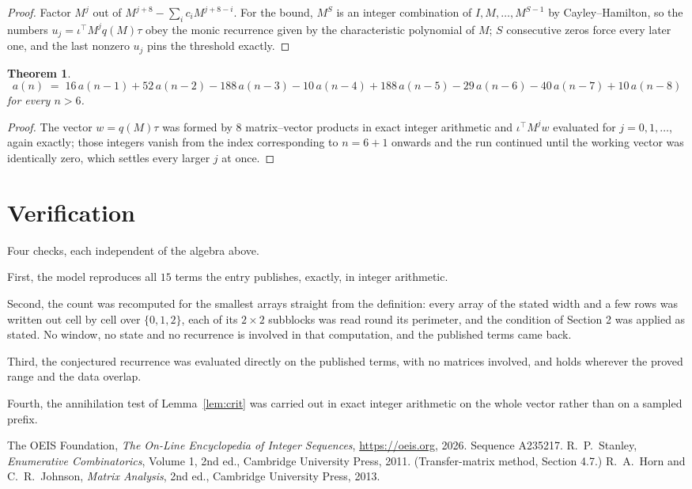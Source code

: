 \documentclass[11pt,a4paper]{article}
\theoremstyle{plain}
\newtheorem{theorem}{Theorem}
\theoremstyle{definition}
\begin{document}
\begin{proof}
Factor $M^{j}$ out of $M^{j+8}-\sum_ic_iM^{j+8-i}$. For the bound, $M^{S}$
is an integer combination of $I,M,\dots,M^{S-1}$ by Cayley--Hamilton, so the numbers
$u_j=\iota^{\!\top}M^{j}q(M)\tau$ obey the monic recurrence given by the characteristic
polynomial of $M$; $S$ consecutive zeros force every later one, and the last nonzero $u_j$
pins the threshold exactly.
\end{proof}

\begin{theorem}
\[
a(n)\;=\;16\,a(n-1) + 52\,a(n-2) - 188\,a(n-3) - 10\,a(n-4) + 188\,a(n-5) - 29\,a(n-6) - 40\,a(n-7) + 10\,a(n-8)
\]
for every $n>6$.
\end{theorem}

\begin{proof}
The vector $w=q(M)\tau$ was formed by $8$ matrix--vector products in exact integer
arithmetic and $\iota^{\!\top}M^{j}w$ evaluated for $j=0,1,\dots$, again exactly; those
integers vanish from the index corresponding to $n=6+1$ onwards and the run continued
until the working vector was identically zero, which settles every larger $j$ at once.
\end{proof}

\section{Verification}

Four checks, each independent of the algebra above.

First, the model reproduces all $15$ terms the entry publishes, exactly, in integer
arithmetic.

Second, the count was recomputed for the smallest arrays straight from the definition: every
array of the stated width and a few rows was written out cell by cell over $\{0,1,2\}$, each of
its $2\times2$ subblocks was read round its perimeter, and the condition of Section 2 was
applied as stated. No window, no state and no recurrence is involved in that computation, and
the published terms came back.

Third, the conjectured recurrence was evaluated directly on the published terms, with no
matrices involved, and holds wherever the proved range and the data overlap.

Fourth, the annihilation test of Lemma~\ref{lem:crit} was carried out in exact integer
arithmetic on the whole vector rather than on a sampled prefix.

\begin{thebibliography}{9}
 The OEIS Foundation, \emph{The On-Line Encyclopedia of Integer
Sequences}, \url{https://oeis.org}, 2026. Sequence A235217.
 R.~P.~Stanley, \emph{Enumerative Combinatorics}, Volume 1, 2nd ed.,
Cambridge University Press, 2011. (Transfer-matrix method, Section 4.7.)
 R.~A.~Horn and C.~R.~Johnson, \emph{Matrix Analysis}, 2nd ed., Cambridge
University Press, 2013.
\end{thebibliography}
\end{document}
